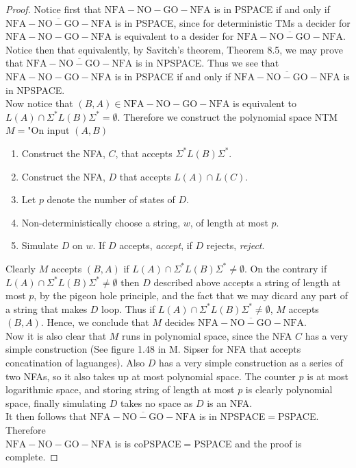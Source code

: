 \documentclass[a4paper,11pt]{article}
\numberwithin{equation}{section}
\begin{document}
	\begin{proof}
		Notice first that $ \mathrm{NFA-NO-GO-NFA} $ is in PSPACE if and only if \\$ \overline{\mathrm{NFA-NO-GO-NFA}} $ is in PSPACE, since for deterministic TMs a decider for\\ $ \mathrm{NFA-NO-GO-NFA} $ is equivalent to a desider for $ \overline{\mathrm{NFA-NO-GO-NFA}} $. Notice then that
		equivalently, by Savitch's theorem, Theorem 8.5, we may prove that $ \overline{\mathrm{NFA-NO-GO-NFA}} $ is in NPSPACE. Thus we see that $ \mathrm{NFA-NO-GO-NFA} $ is in PSPACE if and only if $ \overline{\mathrm{NFA-NO-GO-NFA}} $ is in NPSPACE.\\
		Now notice that $ (B,A)\in \mathrm{NFA-NO-GO-NFA} $ is equivalent to $ L(A)\cap \Sigma^* L(B)\Sigma^*=\emptyset $.
		Therefore we construct the polynomial space NTM $ M= $"On input $ (A,B) $ \begin{enumerate}
			\item Construct the NFA, $ C $, that accepts $ \Sigma^*L(B)\Sigma^* $.
			\item Construct the NFA, $ D $ that accepts $ L(A)\cap L(C) $.
			\item Let $ p $ denote the number of states of $ D $.
			\item Non-deterministically choose a string, $ w $, of length at most $ p $.
			\item Simulate $ D $ on $ w $. If $ D $ accepts, \emph{accept}, if $ D $ rejects, \emph{reject}. 
		\end{enumerate}
		Clearly $ M $ accepts $ (B,A) $ if $ L(A)\cap \Sigma^*L(B)\Sigma^*\neq \emptyset $. On the contrary if $ L(A)\cap \Sigma^*L(B)\Sigma^*\neq \emptyset $ then $ D $ described above accepts a string of length at most $ p $, by the pigeon hole principle, and the fact that we may dicard any part of a string that makes $ D $ loop. Thus if $ L(A)\cap \Sigma^*L(B)\Sigma^*\neq \emptyset  $, $ M $ accepts $ (B,A) $. Hence, we conclude that $ M $ decides $ \overline{\mathrm{NFA-NO-GO-NFA}} $.\\
		Now it is also clear that $ M $ runs in polynomial space, since the NFA $ C $ has a very simple construction (See figure 1.48 in M. Sipser for NFA that accepts concatination of laguanges). Also $ D $ has a very simple construction as a series of two NFAs, so it also takes up at most polynomial space. The counter $ p $ is at most logarithmic space, and storing string of length at most $ p $ is clearly polynomial space, finally simulating $ D$ takes no space as $ D $ is an NFA.\\
		It then follows that $ \overline{\mathrm{NFA-NO-GO-NFA}} $ is in  NPSPACE$ = $PSPACE. Therefore\\ $ \mathrm{NFA-NO-GO-NFA} $ is is  coPSPACE$ = $PSPACE and the proof is complete.
	\end{proof}
\end{document}
